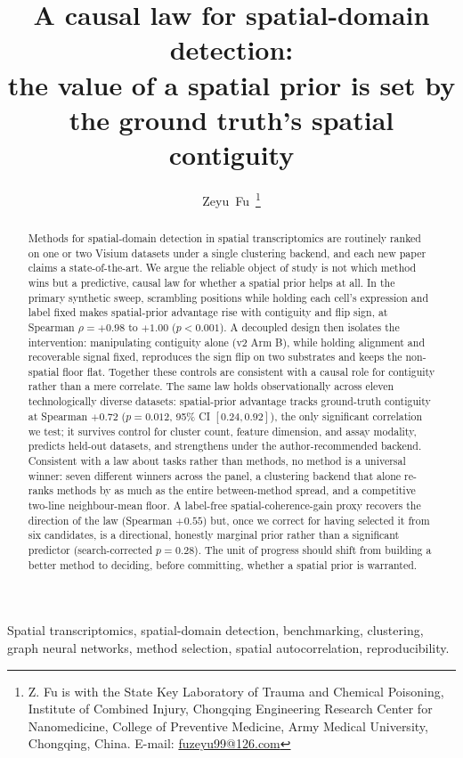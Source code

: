 \documentclass[journal]{IEEEtran}
\title{A causal law for spatial-domain detection:\\
the value of a spatial prior is set by the ground truth's spatial contiguity}
\author{Zeyu~Fu\,\orcidlink{0009-0001-8329-0108}%
\thanks{Z. Fu is with the State Key Laboratory of Trauma and Chemical Poisoning, Institute of
Combined Injury, Chongqing Engineering Research Center for Nanomedicine, College of Preventive
Medicine, Army Medical University, Chongqing, China. E-mail:
\href{mailto:fuzeyu99@126.com}{fuzeyu99@126.com}}}
\begin{document}
\raggedbottom

\maketitle

\begin{abstract}
Methods for spatial-domain detection in spatial transcriptomics are routinely ranked on one or two Visium
datasets under a single clustering backend, and each new paper claims a state-of-the-art. We argue the
reliable object of study is not which method wins but a predictive, causal law for whether a spatial prior
helps at all. In the primary synthetic sweep, scrambling positions while holding each cell's expression
and label fixed makes spatial-prior advantage rise with contiguity and flip sign, at Spearman
$\rho=+0.98$ to $+1.00$ ($p<0.001$). A decoupled design then isolates the intervention: manipulating
contiguity alone (v2 Arm B), while holding alignment and recoverable signal fixed, reproduces the sign flip
on two substrates and keeps the non-spatial floor flat. Together these controls are consistent with a
causal role for contiguity rather than a mere correlate. The same
law holds observationally across eleven technologically diverse datasets: spatial-prior advantage tracks
ground-truth contiguity at Spearman $+0.72$ ($p=0.012$, 95\% CI $[0.24,0.92]$), the only significant
correlation we test; it survives control for cluster count, feature dimension, and assay modality, predicts
held-out datasets, and strengthens under the author-recommended backend. Consistent with a law about tasks
rather than methods, no method is a universal winner: seven different winners across the panel, a clustering
backend that alone re-ranks methods by as much as the entire between-method spread, and a competitive
two-line neighbour-mean floor. A label-free spatial-coherence-gain proxy recovers the direction of the law
(Spearman $+0.55$) but, once we correct for having selected it from six candidates, is a directional,
honestly marginal prior rather than a significant predictor (search-corrected $p=0.28$). The unit of
progress should shift from building a better method to deciding, before committing, whether a spatial prior
is warranted.
\end{abstract}

\begin{IEEEkeywords}
Spatial transcriptomics, spatial-domain detection, benchmarking, clustering, graph neural networks, method
selection, spatial autocorrelation, reproducibility.
\end{IEEEkeywords}
\end{document}
